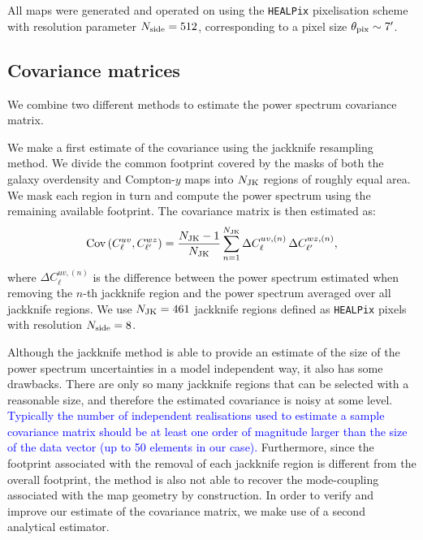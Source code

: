 \documentclass[useAMS,usenatbib]{mn2e}
\newcommand{\DA}[1]{\textcolor{blue}{#1}}
\begin{document}
    All maps were generated and operated on using the {\tt HEALPix} pixelisation scheme \citep{2005ApJ...622..759G} with resolution parameter $N_{\rm side}=512$, corresponding to a pixel size $\theta_{\rm pix}\sim7'$.

  \subsection{Covariance matrices}\label{ssec:methods.cov}
    We combine two different methods to estimate the power spectrum covariance matrix. 
    
    We make a first estimate of the covariance using the jackknife resampling method. We divide the common footprint covered by the masks of both the galaxy overdensity and Compton-$y$ maps into $N_{\rm JK}$ regions of roughly equal area. We mask each region in turn and compute the power spectrum  using the remaining available footprint. The covariance matrix is then estimated as:
    \begin{equation}\label{eq:cov_jk}
      {\rm Cov}\left(C^{uv}_\ell,C^{wz}_{\ell'}\right)=\frac{N_{\rm JK}-1}{N_{\rm JK}}\sum_{n=1}^{N_{\rm JK}}\Delta C^{uv,(n)}_\ell\,\Delta C^{wz,(n)}_{\ell'},
    \end{equation}
    where $\Delta C^{uv,(n)}_\ell$ is the difference between the power spectrum estimated when removing the $n$-th jackknife region and the power spectrum averaged over all jackknife regions. We use $N_{\rm JK}=461$ jackknife regions defined as {\tt HEALPix} pixels with resolution $N_{\rm side}=8$.

    Although the jackknife method is able to provide an estimate of the size of the power spectrum uncertainties in a model independent way, it also has some drawbacks. There are only so many jackknife regions that can be selected with a reasonable size, and therefore the estimated covariance is noisy at some level. \DA{Typically the number of independent realisations used to estimate a sample covariance matrix should be at least one order of magnitude larger than the size of the data vector (up to 50 elements in our case).} Furthermore, since the footprint associated with the removal of each jackknife region is different from the overall footprint, the method is also not able to recover the mode-coupling associated with the map geometry by construction. In order to verify and improve our estimate of the covariance matrix, we make use of a second analytical estimator.
\end{document}

